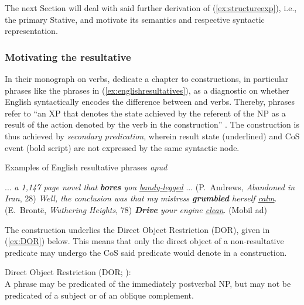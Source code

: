 \documentclass[output=paper,colorlinks,citecolor=brown]{langscibook}
\begin{document}
The next Section will deal with said further derivation of (\ref{ex:structureexp}), i.e., the primary Stative,  and motivate its  semantics and respective syntactic representation.


\subsubsection{Motivating the resultative}\label{sec:resultative_motivation}

In their monograph on  verbs, \citet{LevinRappaport1995} dedicate a chapter to  constructions, in particular  phrases like the phrases in (\ref{ex:englishresultatives}), as a diagnostic on whether English syntactically encodes the difference between  and  verbs. Thereby,  phrases refer to ``an XP that denotes the state achieved by the referent of the NP as a result of the action denoted by the verb in the  construction'' \citep[34]{LevinRappaport1995}. The  construction is thus achieved by \textit{secondary predication}, wherein result state (underlined) and CoS event (bold script) are not expressed by the same syntactic node.

\begin{exe}  \ex Examples of English resultative phrases \textit{apud} \citet[34ff.]{LevinRappaport1995}\label{ex:englishresultatives}
\begin{xlist}
    \ex   ... \textit{a 1,147 page novel that \textbf{bores} you \underline{bandy-legged}} ... (P.\ Andrews, \textit{Abandoned in Iran}, 28)
    \ex \textit{Well, the conclusion was that my mistress \textbf{grumbled} herself \underline{calm}}. (E.\ Bront\"e, \textit{Wuthering Heights}, 78)
    \ex \textit{\textbf{Drive} your engine \underline{clean}}. (Mobil ad)
\end{xlist}
\end{exe} 

 The  construction underlies the Direct Object Restriction (DOR), given in (\ref{ex:DOR}) below. This means that only the direct object of a non-resultative predicate may undergo the CoS  said predicate would denote in a  construction.

\begin{exe} 
\ex \label{ex:DOR} Direct Object Restriction (DOR; \cite[34, 41]{LevinRappaport1995}):\\
A  phrase may be predicated of the immediately postverbal NP, but may not be predicated of a subject or of an oblique complement.
\end{exe}
\end{document}
